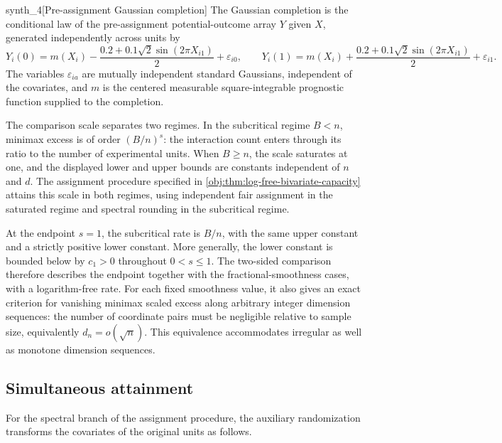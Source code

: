 \documentclass[11pt]{article}
\begin{document}
\begin{definitionv}{synth_4}[Pre-assignment Gaussian completion]
The Gaussian completion is the conditional law of the pre-assignment potential-outcome array \(Y\) given \(X\), generated independently across units by
\[
Y_i(0)=m(X_i)-\frac{0.2+0.1\sqrt2\sin(2\pi X_{i1})}{2}+\varepsilon_{i0},
\qquad
Y_i(1)=m(X_i)+\frac{0.2+0.1\sqrt2\sin(2\pi X_{i1})}{2}+\varepsilon_{i1}.
\]
The variables \(\varepsilon_{ia}\) are mutually independent standard Gaussians, independent of the covariates, and \(m\) is the centered measurable square-integrable prognostic function supplied to the completion.
\end{definitionv}

The comparison scale separates two regimes. In the subcritical regime \(B<n\), minimax excess is of order \((B/n)^s\): the interaction count enters through its ratio to the number of experimental units. When \(B\geq n\), the scale saturates at one, and the displayed lower and upper bounds are constants independent of \(n\) and \(d\). The assignment procedure  specified in \cref{obj:thm:log-free-bivariate-capacity} attains this scale in both regimes, using independent fair assignment in the saturated regime and spectral rounding in the subcritical regime.

At the endpoint \(s=1\), the subcritical rate is \(B/n\), with the same upper constant and a strictly positive lower constant. More generally, the lower constant  is bounded below by \(c_1>0\) throughout \(0<s\leq1\). The two-sided comparison therefore describes the endpoint together with the fractional-smoothness cases, with a logarithm-free rate. For each fixed smoothness value, it also gives an exact criterion for vanishing minimax scaled excess along arbitrary integer dimension sequences: the number of coordinate pairs must be negligible relative to sample size, equivalently \(d_n=o(\sqrt n)\). This equivalence accommodates irregular as well as monotone dimension sequences.

\subsection{Simultaneous attainment}

For the spectral branch of the assignment procedure, the auxiliary randomization transforms the covariates of the original units as follows.
\end{document}
